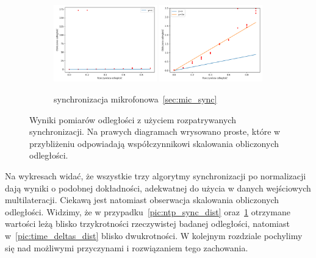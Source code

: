 \begin{figure}[H]
    \ContinuedFloat\centering
    \begin{subfigure}{\textwidth}
        \centering
        \includegraphics[width=0.49\textwidth]{pics/mic_sync_dist/dists.png}
        \includegraphics[width=0.49\textwidth]{pics/mic_sync_dist/dists_close.png}
        \caption{synchronizacja mikrofonowa~\ref{sec:mic_sync}}
        \label{pic:mic_sync_dist}
    \end{subfigure}
    \caption[Wyniki pomiarów odległości z użyciem rozpatrywanych synchronizacji]{Wyniki pomiarów odległości z użyciem rozpatrywanych synchronizacji. Na prawych diagramach wrysowano proste, które w przybliżeniu odpowiadają współczynnikowi skalowania obliczonych odległości.}
    \label{fig:sync_test}
\end{figure}

Na wykresach widać, że wszystkie trzy algorytmy synchronizacji po normalizacji dają wyniki o podobnej dokładności, adekwatnej do użycia w danych wejściowych multilateracji. Ciekawą jest natomiast obserwacja skalowania obliczonych odległości. Widzimy, że w przypadku~\ref{pic:ntp_sync_dist} oraz~\ref{pic:mic_sync_dist} otrzymane wartości leżą blisko trzykrotności rzeczywistej badanej odległości, natomiast w~\ref{pic:time_deltas_dist} blisko dwukrotności. W kolejnym rozdziale pochylimy się nad możliwymi przyczynami i rozwiązaniem tego zachowania.